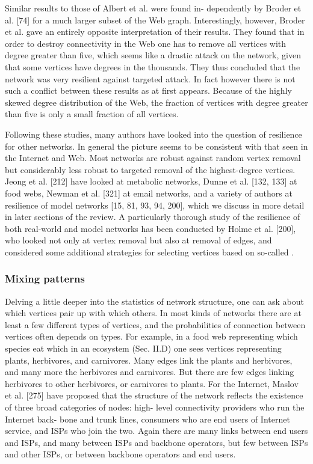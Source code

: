       Similar results to those of Albert et al. were found in- dependently by Broder et al. [74] for a much larger subset of the Web graph. Interestingly, however, Broder et al. gave an entirely opposite interpretation of their results. They found that in order to destroy connectivity in the Web one has to remove all vertices with degree greater than five, which seems like a drastic attack on the network, given that some vertices have degrees in the thousands. They thus concluded that the network was very resilient against targeted attack. In fact however there is not such a conflict between these results as at first appears. Because of the highly skewed degree distribution of the Web, the fraction of vertices with degree greater than five is only a small fraction of all vertices.
      
      Following these studies, many authors have looked into the question of resilience for other networks. In general the picture seems to be consistent with that seen in the Internet and Web. Most networks are robust against random vertex removal but considerably less robust to targeted removal of the highest-degree vertices. Jeong et al. [212] have looked at metabolic networks, Dunne et al. [132, 133] at food webs, Newman et al. [321] at email networks, and a variety of authors at resilience of model networks [15, 81, 93, 94, 200], which we discuss in more detail in later sections of the review. A particularly thorough study of the resilience of both real-world and model networks has been conducted by Holme et al. [200], who looked not only at vertex removal but also at removal of edges, and considered some additional strategies for selecting vertices based on so-called .
      
    \subsubsection{Mixing patterns}
    
      Delving a little deeper into the statistics of network structure, one can ask about which vertices pair up with which others. In most kinds of networks there are at least a few different types of vertices, and the probabilities of connection between vertices often depends on types. For example, in a food web representing which species eat which in an ecosystem (Sec. II.D) one sees vertices representing plants, herbivores, and carnivores. Many edges link the plants and herbivores, and many more the herbivores and carnivores. But there are few edges linking herbivores to other herbivores, or carnivores to plants. For the Internet, Maslov et al. [275] have proposed that the structure of the network reflects the existence of three broad categories of nodes: high- level connectivity providers who run the Internet back- bone and trunk lines, consumers who are end users of Internet service, and ISPs who join the two. Again there are many links between end users and ISPs, and many between ISPs and backbone operators, but few between ISPs and other ISPs, or between backbone operators and end users.
      
